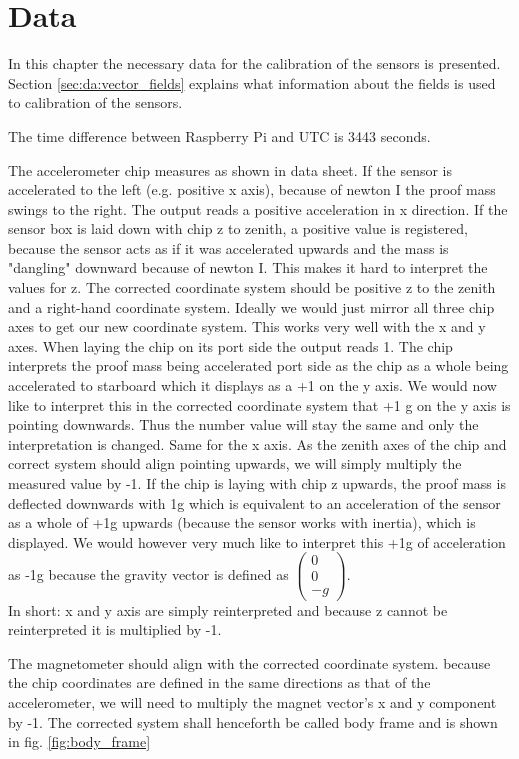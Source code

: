 \chapter{Data \label{ch:data}}
In this chapter the necessary data for the calibration of the sensors is presented. Section \ref{sec:da:vector_fields} explains what information about the fields is used to calibration of the sensors.

The time difference between Raspberry Pi and UTC is 3443 seconds.

The accelerometer chip measures as shown in data sheet. If the sensor is accelerated to the left (e.g. positive x axis), because of newton I the proof mass swings to the right. The output reads a positive acceleration in x direction. If the sensor box is laid down with chip z to zenith, a positive value is registered, because the sensor acts as if it was accelerated upwards and the mass is "dangling" downward because of newton I. This makes it hard to interpret the values for z. The corrected coordinate system should be positive z to the zenith and a right-hand coordinate system. Ideally we would just mirror all three chip axes to get our new coordinate system. This works very well with the x and y axes. When laying the chip on its port side the output reads 1. The chip interprets the proof mass being accelerated port side as the chip as a whole being accelerated to starboard which it displays as a +1 on the y axis. We would now like to interpret this in the corrected coordinate system that +1 g on the y axis is pointing downwards. Thus the number value will stay the same and only the interpretation is changed. Same for the x axis. As the zenith axes of the chip and correct system should align pointing upwards, we will simply multiply the measured value by -1. If the chip is laying with chip z upwards, the proof mass is deflected downwards with 1g  which is equivalent to an acceleration of the sensor as a whole of +1g upwards (because the sensor works with inertia), which is displayed. We would however very much like to interpret this +1g of acceleration as -1g because the gravity vector is defined as $\begin{pmatrix} 0 \\ 0\\ -g \end{pmatrix}.$ \\
In short: x and y axis are simply reinterpreted and because z cannot be reinterpreted it is multiplied by -1.

The magnetometer should align with the corrected coordinate system. because the chip coordinates are defined in the same directions as that of the accelerometer, we will need to multiply the magnet vector's x and y component by -1. The corrected system shall henceforth be called body frame and is shown in fig. \ref{fig:body_frame}

